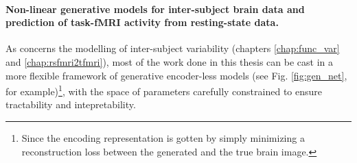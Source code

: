 \paragraph{Non-linear generative models for inter-subject brain data and prediction of task-fMRI activity from resting-state data.}
As concerns the modelling of inter-subject variability (chapters \ref{chap:func_var} and \ref{chap:rsfmri2tfmri}), most of the work done in this thesis can be cast in a more flexible framework of generative encoder-less models (see Fig. \ref{fig:gen_net}, for example)\footnote{Since the encoding representation is gotten by simply minimizing a reconstruction loss between the generated and the true brain image.}, with the space of parameters carefully constrained to ensure tractability and intepretability.
  


